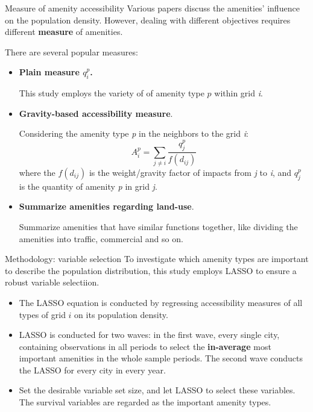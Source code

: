\documentclass[aspectratio=169,xcolor=dvipsnames]{beamer}
\begin{document}
\begin{frame}{Measure of amenity accessibility}
	Various papers discuss the amenities' influence on the population density. However, dealing with different objectives requires different \textbf{measure} of amenities.\par 
	There are several popular measures:
	\begin{itemize}
		\item \textbf{Plain measure $q^p_{i}$.}\par 
		{\small This study employs the variety of of amenity type $p$ within grid \textit{i}}.
		\item \textbf{Gravity-based accessibility measure}.\par 
		{\small Considering the amenity type \textit{p} in the neighbors to the grid \textit{i}:}
		\begin{equation}
			A_i^p=\sum_{j\neq i}\frac{q_j^p}{f(d_{ij})}
		\end{equation}where the $f(d_{ij})$ is the weight/gravity factor of impacts from \textit{j} to \textit{i}, and $q^p_{j}$ is the quantity of amenity \textit{p} in grid \textit{j}. 
		\item \textbf{Summarize amenities regarding land-use}. \par 
		{\small Summarize amenities that have similar functions together, like dividing the amenities into traffic, commercial and so on.}
	\end{itemize}
\end{frame}

\begin{frame}{Methodology: variable selection}
	To investigate which amenity types are important to describe the population distribution, this study employs LASSO to ensure a robust variable selectiion.
	\par 
		\begin{itemize}
			\item The LASSO equation is conducted by regressing accessibility measures of all types of grid $i$ on its population density.
			\item LASSO is conducted for two waves: in the first wave, every single city, containing observations in all periods to select the \textbf{in-average} most important amenities in the whole sample periods. The second wave conducts the LASSO for every city in every year.
			\item Set the desirable variable set size, and let LASSO to select these variables. The survival variables are regarded as the important amenity types.
		\end{itemize}
\end{frame}
\end{document}
